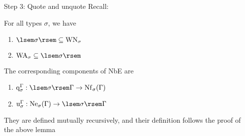 \documentclass{beamer}
\begin{document}
\begin{frame}{Step 3: Quote and unquote}
Recall:
\begin{lem}
For all types $\sigma$, we have
\begin{enumerate}
    \item $\sem{\sigma} \subs \mathrm{WN}_\sigma$
    \item $\mathrm{WA}_\sigma \subs \sem{\sigma}$
\end{enumerate}
\end{lem}
The corresponding components of NbE are
\begin{enumerate}
    \item $\quotef{\Gamma}{\sigma} : \sem{\sigma} \Gamma \to \cNf{\Gamma}{\sigma}$
    \item $\unquotef{\Gamma}{\sigma} : \cNe{\Gamma}{\sigma} \to \sem{\sigma} \Gamma$
\end{enumerate}
They are defined mutually recursively, and their definition follows the proof of the above lemma
\end{frame}

\begin{comment}
\begin{frame}
\begin{itemize}
    \item Define $\quotef{\Gamma}{\sigma} : \sem{\sigma}\Gamma \to \cNf{\Gamma}{\sigma}$ and $\unquotef{\Gamma}{\sigma} : \cNe{\Gamma}{\sigma} \to \sem{\sigma}\Gamma$
    \item Define normalization function $\normf{\Gamma}{\sigma} : \cTm{\Gamma}{\sigma} \to \cNf{\Gamma}{\sigma}$
    \begin{align*}
        \normf{\Gamma}{\sigma}(t) &= \quotef{\Gamma}{\sigma}(\ksint{t}{\eta_\Gamma}{\Gamma}), \text{ where}\\
        \idenv{\Gamma}(x, \Gamma') &= \unquotef{\Gamma'}{\sigma}(x)
        \quad \text{for } (x : \sigma) \in \Gamma' \sups \Gamma
    \end{align*}
\end{itemize}
\end{frame}
\end{comment}
\end{document}
